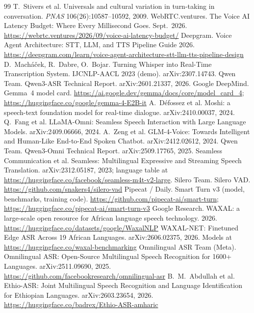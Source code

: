 \begin{thebibliography}{99}
\small
{} T.~Stivers et al. Universals and cultural variation in turn-taking in conversation. \emph{PNAS} 106(26):10587--10592, 2009.
 WebRTC.ventures. The Voice AI Latency Budget: Where Every Millisecond Goes. Sept.\ 2026. \url{https://webrtc.ventures/2026/09/voice-ai-latency-budget/}
 Deepgram. Voice Agent Architecture: STT, LLM, and TTS Pipeline Guide 2026. \url{https://deepgram.com/learn/voice-agent-architecture-stt-llm-tts-pipeline-design}
 D.~Macháček, R.~Dabre, O.~Bojar. Turning Whisper into Real-Time Transcription System. IJCNLP-AACL 2023 (demo). arXiv:2307.14743.
 Qwen Team. Qwen3-ASR Technical Report. arXiv:2601.21337, 2026.
 Google DeepMind. Gemma~4 model card. \url{https://ai.google.dev/gemma/docs/core/model_card_4}; \url{https://huggingface.co/google/gemma-4-E2B-it}
 A.~Défossez et al. Moshi: a speech-text foundation model for real-time dialogue. arXiv:2410.00037, 2024.
 Q.~Fang et al. LLaMA-Omni: Seamless Speech Interaction with Large Language Models. arXiv:2409.06666, 2024.
 A.~Zeng et al. GLM-4-Voice: Towards Intelligent and Human-Like End-to-End Spoken Chatbot. arXiv:2412.02612, 2024.
 Qwen Team. Qwen3-Omni Technical Report. arXiv:2509.17765, 2025.
 Seamless Communication et al. Seamless: Multilingual Expressive and Streaming Speech Translation. arXiv:2312.05187, 2023; language table at \url{https://huggingface.co/facebook/seamless-m4t-v2-large}.
 Silero Team. Silero VAD. \url{https://github.com/snakers4/silero-vad}
 Pipecat / Daily. Smart Turn v3 (model, benchmarks, training code). \url{https://github.com/pipecat-ai/smart-turn}; \url{https://huggingface.co/pipecat-ai/smart-turn-v3}
 Google Research. WAXAL: a large-scale open resource for African language speech technology. 2026. \url{https://huggingface.co/datasets/google/WaxalNLP}
 WAXAL-NET: Finetuned Edge ASR Across 19 African Languages. arXiv:2606.02375, 2026. Models at \url{https://huggingface.co/waxal-benchmarking}
 Omnilingual ASR Team (Meta). Omnilingual ASR: Open-Source Multilingual Speech Recognition for 1600+ Languages. arXiv:2511.09690, 2025. \url{https://github.com/facebookresearch/omnilingual-asr}
 B.~M.~Abdullah et al. Ethio-ASR: Joint Multilingual Speech Recognition and Language Identification for Ethiopian Languages. arXiv:2603.23654, 2026. \url{https://huggingface.co/badrex/Ethio-ASR-amharic}

\end{thebibliography}
